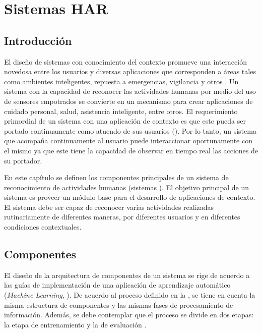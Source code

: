 
\chapter{Sistemas HAR }

\label{chap4:sistemas-de-reconocimiento}

\section{Introducción}

\label{sec41:introduccion}El diseño de sistemas con conocimiento
del contexto promueve una interacción novedosa entre los usuarios
y diversas aplicaciones que corresponden a áreas tales como ambientes
inteligentes, repuesta a emergencias, vigilancia y otros \cite{Choudhury2008}.
Un sistema con la capacidad de reconocer las actividades humanas por
medio del uso de sensores empotrados se convierte en un mecanismo
para crear aplicaciones de cuidado personal, salud, asistencia inteligente,
entre otros. El requerimiento primordial de un sistema con una aplicación
de contexto es que este pueda ser portado continuamente como atuendo
de sus usuarios (\emph{}). Por lo tanto, un sistema
que acompaña continuamente al usuario puede interaccionar oportunamente
con el mismo ya que este tiene la capacidad de observar en tiempo
real las acciones de su portador. 

En este capítulo se definen los componentes principales de un sistema
de reconocimiento de actividades humanas (sistemas ). El
objetivo principal de un sistema  es proveer un módulo
base para el desarrollo de aplicaciones de contexto. El sistema debe
ser capaz de reconocer varias actividades realizadas rutinariamente
de diferentes maneras, por diferentes usuarios y en diferentes condiciones
contextuales. 

\section{Componentes}

\label{sec42:componentes}El diseño de la arquitectura de componentes
de un sistema  se rige de acuerdo a las guías de implementación
de una aplicación de aprendizaje automático (\emph{Machine Learning},
). De acuerdo al proceso definido en la ,
se tiene en cuenta la misma estructura de componentes y las mismas
fases de procesamiento de información. Además, se debe contemplar
que el proceso se divide en dos etapas: la etapa de entrenamiento
y la de evaluación \cite{LaraLabrador2013}.

